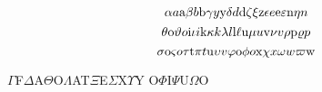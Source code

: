 


\[
\alpha a \hbox{a} \beta b \hbox{b} \gamma y \hbox{y} \delta d \hbox{d} \zeta \xi
\hbox{z} \epsilon e \hbox{e} \varepsilon \hbox{n} \eta n
\]
\[
\theta \hbox{o} \vartheta o \hbox{i} \iota i \hbox{k} \kappa k \lambda l
\hbox{l} \ell \hbox{u} \mu u \hbox{v} \nu v \rho \hbox{p} \varrho p
\]
\[
\sigma \hbox{o} \varsigma o \tau \hbox{t} \pi t \hbox{u} \upsilon v \varphi
\hbox{o} \phi o \hbox{x} \chi x \omega w \varpi \hbox{w}
\]
\begin{center}
$\Gamma$F$\Delta$A$\Theta$O$\Lambda$AT$\Xi$E$\Sigma$X$\Upsilon$Y
O$\Phi$I$\Psi$U$\Omega$O
\end{center}


